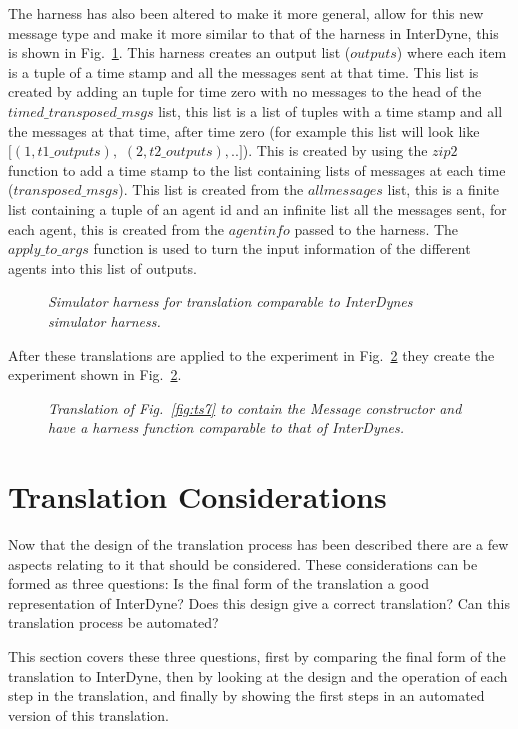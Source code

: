 \documentclass{article}
\begin{document}
The harness has also been altered to make it more general, allow for this new message type and make it more similar to that of the harness in InterDyne, this is shown in Fig.~\ref{fig:harn8}. This harness creates an output list ($outputs$) where each item is a tuple of a time stamp and all the messages sent at that time. This list is created by adding an tuple for time zero with no messages to the head of the $timed\_transposed\_msgs$ list, this list is a list of tuples with a time stamp and all the messages at that time, after time zero (for example this list will look like $[(1, t1\_outputs),$ $(2, t2\_outputs), ..]$). This is created by using the $zip2$ function to add a time stamp to the list containing lists of messages at each time ($transposed\_msgs$). This list is created from the $allmessages$ list, this is a finite list containing a tuple of an agent id and an infinite list all the messages sent, for each agent, this is created from the $agentinfo$ passed to the harness. The $apply\_to\_args$ function is used to turn the input information of the different agents into this list of outputs.
\begin{figure}[H]
	\centering
	
	\caption{\it Simulator harness for translation comparable to InterDynes simulator harness.}
	\label{fig:harn8}
\end{figure} 

After these translations are applied to the experiment in Fig.~\ref{fig:ts8} they create the experiment shown in Fig.~\ref{fig:ts8}.
\begin{figure}[H]
	\centering
	
	\caption{\it Translation of Fig.~\ref{fig:ts7} to contain the Message constructor and have a harness function comparable to that of InterDynes.}
	\label{fig:ts8}
\end{figure} 



\section{Translation Considerations}
Now that the design of the translation process has been described there are a few aspects relating to it that should be considered. These considerations can be formed as three questions: Is the final form of the translation a good representation of InterDyne? Does this design give a correct translation? Can this translation process be automated?   

This section covers these three questions, first by comparing the final form of the translation to InterDyne, then by looking at the design and the operation of each step in the translation, and finally by showing the first steps in an automated version of this translation.  
\end{document}
